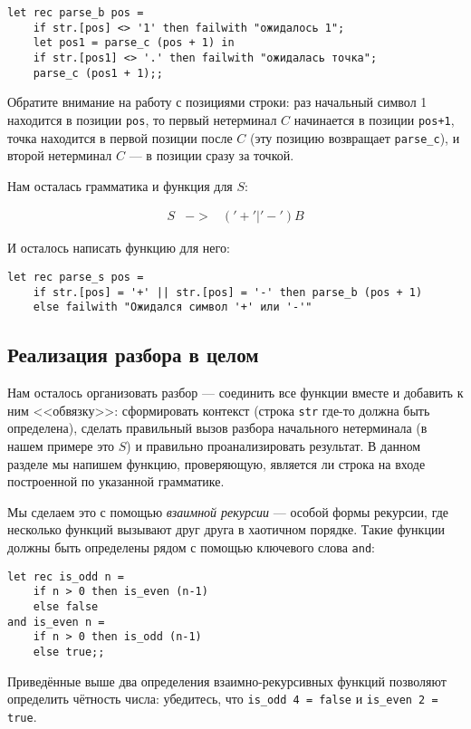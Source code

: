 \documentclass[12pt]{article}
\begin{document}
\begin{verbatim}
let rec parse_b pos =
    if str.[pos] <> '1' then failwith "ожидалось 1";
    let pos1 = parse_c (pos + 1) in
    if str.[pos1] <> '.' then failwith "ожидалась точка";
    parse_c (pos1 + 1);;
\end{verbatim}

Обратите внимание на работу с позициями строки: раз начальный символ 1 находится
в позиции \verb!pos!, то первый нетерминал $C$ начинается в позиции \verb!pos+1!,
точка находится в первой позиции после $C$ (эту позицию возвращает \verb!parse_c!),
и второй нетерминал $C$ --- в позиции сразу за точкой.

Нам осталась грамматика и функция для $S$:
\begin{bnf}\begin{eqnarray*}
S &->& ('+'|'-') B
\end{eqnarray*}\end{bnf}%
\noindent И осталось написать функцию для него:
\begin{verbatim}
let rec parse_s pos =
    if str.[pos] = '+' || str.[pos] = '-' then parse_b (pos + 1)
    else failwith "Ожидался символ '+' или '-'"
\end{verbatim}

\subsection{Реализация разбора в целом}

Нам осталось организовать разбор --- соединить все функции вместе и добавить к ним
<<обвязку>>: сформировать контекст (строка \verb!str! где-то должна быть определена),
сделать правильный вызов разбора начального нетерминала (в нашем примере это $S$) и
правильно проанализировать результат. В данном разделе мы напишем функцию,
проверяющую, является ли строка на входе построенной по указанной грамматике.

Мы сделаем это с помощью \emph{взаимной рекурсии} --- особой формы рекурсии, где
несколько функций вызывают друг друга в хаотичном порядке. Такие функции должны быть
определены рядом с помощью ключевого слова \verb!and!:

\begin{verbatim}
let rec is_odd n = 
    if n > 0 then is_even (n-1)
    else false
and is_even n =
    if n > 0 then is_odd (n-1)
    else true;;
\end{verbatim}

\noindent Приведённые выше два определения взаимно-рекурсивных функций позволяют определить чётность
числа: убедитесь, что \verb!is_odd 4 = false! и \verb!is_even 2 = true!.
\end{document}
